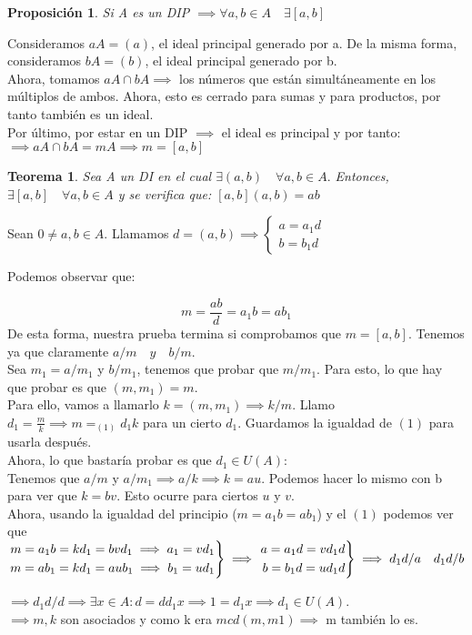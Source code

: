 \documentclass[11pt, a4paper, titlepage]{article}
\makeatletter
\renewenvironment{proof}[1][\proofname] {\vspace{-15pt}\par\pushQED{\qed}\normalfont\topsep6\p@\@plus6\p@\relax\trivlist\item[\hskip\labelsep\it#1\@addpunct{.}]\ignorespaces}{\popQED\endtrivlist\@endpefalse}
\theoremstyle{theorem-style}
\newtheorem*{nth}{Teorema}
\newtheorem*{nprop}{Proposición}
\theoremstyle{definition-style}
\theoremstyle{remark-style}
\theoremstyle{example-style}
\newenvironment{rcases}
  {\left.\begin{aligned}}
  {\end{aligned}\right\rbrace}
\makeatother
\begin{document}
\begin{nprop}
	Si A es un DIP $\implies \forall a,b \in A \quad \exists [a,b]$
\end{nprop}
\begin{proof}
	Consideramos $aA = (a)$, el ideal principal generado por a. De la misma forma, consideramos $bA = (b)$, el ideal principal generado por b.\\
	Ahora, tomamos $aA \cap bA \implies$ los números que están simultáneamente en los múltiplos de ambos.
	Ahora, esto es cerrado para sumas y para productos, por tanto también es un ideal.\\
	Por último, por estar en un DIP $\implies$ el ideal es principal y por tanto:\\ $\implies aA\cap bA = mA \implies m = [a,b]$ 
\end{proof}


\begin{nth}
	Sea A un DI en el cual $\exists(a,b) \quad \forall a,b \in A.$ Entonces, $\exists [a,b] \quad \forall a,b \in A $ y se verifica que: $[a,b](a,b) = ab$
\end{nth}
\begin{proof}
	Sean $0 \ne a,b \in A$. Llamamos $d=(a,b) \implies \begin{cases}
	a = a_1 d\\
	b = b_1 d
\end{cases}$

Podemos observar que:

\[
m = \frac{ab}{d} = a_1b = ab_1
\]
De esta forma, nuestra prueba termina si comprobamos que $m = [a,b]$. Tenemos ya que claramente $a/m \quad y \quad b/m$.\\

Sea $m_1 = a/m_1 $ y $b/m_1$, tenemos que probar que $m/m_1$. Para esto, lo que hay que probar es que $(m,m_1) = m$.\\
Para ello, vamos a llamarlo $k = (m,m_1) \implies k/m$. Llamo $d_1 = \frac{m}{k} \implies m =_{(1)} d_1k$ para un cierto $d_1$. Guardamos la igualdad de $(1)$ para usarla después.\\
Ahora, lo que bastaría probar es que $d_1 \in U(A)$:\\
Tenemos que $a/m$ y $a/m_1 \implies a /k \implies k = au$. Podemos hacer lo mismo con b para ver que $k = bv$. Esto ocurre para ciertos $u$ y $v$.\\
Ahora, usando la igualdad del principio ($m = a_1b = ab_1$) y el $(1)$ podemos ver que $\begin{rcases}
	m = a_1b = kd_1 = bvd_1 \implies a_1 = vd_1\\
m = ab_1 = kd_1 = aub_1  \implies  b_1 = ud_1
\end{rcases} \implies \begin{rcases}
	a = a_1d = vd_1 d\\
b = b_1d = ud_1d
\end{rcases} \implies d_1d/a \quad d_1d/b$


$\implies d_1d /d \implies \exists x \in A : d = dd_1 x \implies 1 = d_1 x \implies d_1 \in U(A)$.\\
$\implies m,k$ son asociados y como k era $mcd(m,m1) \implies$ m también lo es.
\end{proof}
\end{document}
